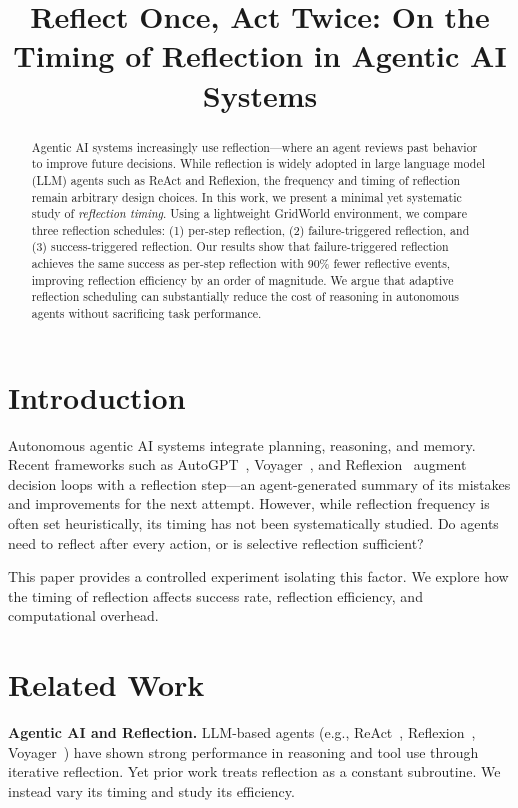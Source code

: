 \documentclass[conference]{IEEEtran}
\title{Reflect Once, Act Twice: On the Timing of Reflection in Agentic AI Systems}
\author{
\IEEEauthorblockN{Srikanth Baride}
\IEEEauthorblockA{
University of South Dakota \\
\texttt{srikanth.baride@usd.edu}}
}
\begin{document}
\maketitle

\begin{abstract}
Agentic AI systems increasingly use reflection---where an agent reviews past behavior to improve future decisions.
While reflection is widely adopted in large language model (LLM) agents such as ReAct and Reflexion,
the frequency and timing of reflection remain arbitrary design choices.
In this work, we present a minimal yet systematic study of \emph{reflection timing}.
Using a lightweight GridWorld environment, we compare three reflection schedules:
(1) per-step reflection, (2) failure-triggered reflection, and (3) success-triggered reflection.
Our results show that failure-triggered reflection achieves the same success as per-step reflection
with 90\% fewer reflective events, improving reflection efficiency by an order of magnitude.
We argue that adaptive reflection scheduling can substantially reduce the cost of reasoning
in autonomous agents without sacrificing task performance.
\end{abstract}

\section{Introduction}
Autonomous agentic AI systems integrate planning, reasoning, and memory.
Recent frameworks such as AutoGPT~\cite{torant2023autogpt}, Voyager~\cite{wang2023voyager}, and Reflexion~\cite{shinn2023reflexion}
augment decision loops with a reflection step---an agent-generated summary of
its mistakes and improvements for the next attempt.
However, while reflection frequency is often set heuristically,
its timing has not been systematically studied.
Do agents need to reflect after every action, or is selective reflection sufficient?

This paper provides a controlled experiment isolating this factor.
We explore how the timing of reflection affects success rate,
reflection efficiency, and computational overhead.

\section{Related Work}
\textbf{Agentic AI and Reflection.}
LLM-based agents (e.g., ReAct~\cite{yao2023react}, Reflexion~\cite{shinn2023reflexion}, Voyager~\cite{wang2023voyager})
have shown strong performance in reasoning and tool use through iterative reflection.
Yet prior work treats reflection as a constant subroutine.
We instead vary its timing and study its efficiency.
\end{document}
